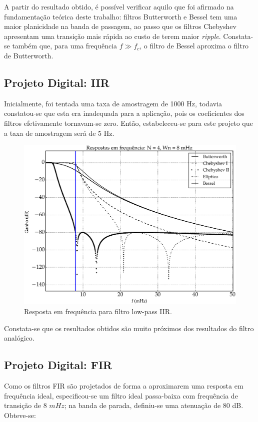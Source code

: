A partir do resultado obtido, é possível verificar aquilo que foi afirmado na fundamentação teórica deste trabalho: filtros Butterworth e Bessel tem uma maior planicidade na banda de passagem, ao passo que os filtros Chebyshev apresentam uma transição mais rápida ao custo de terem maior \textit{ripple}. Constata-se também que, para uma frequência $f \gg f_c$, o filtro de Bessel aproxima o filtro de Butterworth.

\subsection{Projeto Digital: IIR}
Inicialmente, foi tentada uma taxa de amostragem de 1000 Hz, todavia constatou-se que esta era inadequada para a aplicação, pois os coeficientes dos filtros efetivamente tornavam-se zero. Então, estabeleceu-se para este projeto que a taxa de amostragem será de 5 Hz.

\begin{figure}[H]
  \centering
  \includegraphics[scale=0.55]{images/plots/lowpass_IIR}
  \caption{Resposta em frequência para filtro low-pass IIR.}
  \label{fig:lowpass_iir_response}
\end{figure}

Constata-se que os resultados obtidos são muito próximos dos resultados do filtro analógico.

\subsection{Projeto Digital: FIR}
Como os filtros FIR são projetados de forma a aproximarem uma resposta em frequência ideal, especificou-se um filtro ideal passa-baixa com frequência de transição de 8 $mHz$; na banda de parada, definiu-se uma atenuação de 80 dB. Obteve-se:


